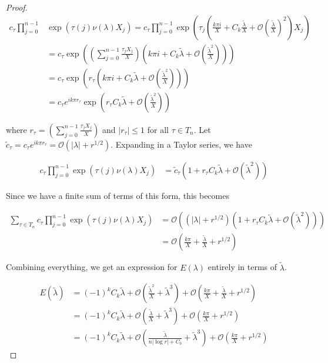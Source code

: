\documentclass[thesis.tex]{subfiles}
\begin{document}
\begin{lemma}
\begin{proof}
\begin{align*}
c_\tau \prod_{j = 0}^{n-1} &\exp\left( {\tau(j) \nu(\lambda)X_j} \right)
= c_\tau \prod_{j = 0}^{n-1} 
\exp\left( \tau_j \left( \frac{k \pi i}{X} + C_k \frac{\tilde{\lambda}}{X} + \mathcal{O}\left( \frac{\tilde{\lambda}}{X}\right)^2 \right) X_j\right) \\
&= c_\tau \exp\left( \left( \sum_{j=0}^{n-1} \frac{\tau_j X_j}{X} \right)
\left( k \pi i + C_k \tilde{\lambda} + \mathcal{O}\left( \frac{\tilde{\lambda}^2}{X} \right) \right) \right) \\
&= c_\tau \exp\left( r_\tau
\left( k \pi i + C_k \tilde{\lambda} + \mathcal{O}\left( \frac{\tilde{\lambda}^2}{X} \right) \right) \right) \\ 
&= c_\tau e^{i k \pi r_\tau} \exp \left( r_\tau C_k \tilde{\lambda} + \mathcal{O}\left( \frac{\tilde{\lambda}^2}{X} \right) \right)
\end{align*}

where $r_\tau = \left( \sum_{j=0}^{n-1} \frac{\tau_j X_j}{X} \right)$ and $|r_\tau| \leq 1$ for all $\tau \in T_n$. Let $\tilde{c}_\tau = c_\tau e^{i k \pi r_\tau} = \mathcal{O}(|\lambda| + r^{1/2})$. Expanding in a Taylor series, we have

\begin{align*}
c_\tau \prod_{j = 0}^{n-1} \exp\left( {\tau(j) \nu(\lambda)X_j} \right)
&= \tilde{c}_\tau \left( 1 + r_\tau C_k \tilde{\lambda} + \mathcal{O}\left(\tilde{\lambda}^2 \right) \right) 
\end{align*}

Since we have a finite sum of terms of this form, this becomes

\begin{align*}
\sum_{\tau \in T_n} c_\tau \prod_{j = 0}^{n-1} \exp\left( {\tau(j) \nu(\lambda)X_j} \right)
&= \mathcal{O}\left( (|\lambda| + r^{1/2}) \left( 1 + r_\tau C_k \tilde{\lambda} + \mathcal{O}\left(\tilde{\lambda}^2 \right) \right)\right) \\
&= \mathcal{O} \left( \frac{k \pi}{X} + \frac{\tilde{\lambda}}{X} + r^{1/2} \right)
\end{align*}

Combining everything, we get an expression for $E(\lambda)$ entirely in terms of $\tilde{\lambda}$.

\begin{align*}
E(\tilde{\lambda})
&= (-1)^k C_k \tilde{\lambda} + \mathcal{O}\left( \frac{\tilde{\lambda}^2}{X} + \tilde{\lambda}^3 \right) + \mathcal{O} \left( \frac{k \pi}{X} + \frac{\tilde{\lambda}}{X} + r^{1/2} \right) \\
&= (-1)^k C_k \tilde{\lambda} + \mathcal{O}\left( \frac{\tilde{\lambda}}{X} + \tilde{\lambda}^3 \right) + \mathcal{O} \left( \frac{k \pi}{X} + r^{1/2} \right) \\
&= (-1)^k C_k \tilde{\lambda} + \mathcal{O}\left( \frac{\tilde{\lambda}}{n|\log r| + C_b} + \tilde{\lambda}^3 \right) + \mathcal{O} \left( \frac{k \pi}{X} + r^{1/2} \right)
\end{align*}


\end{proof}
\end{lemma}
\end{document}
